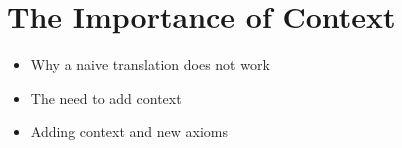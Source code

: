 \section{The Importance of Context}

\begin{itemize}
  \item Why a naive translation does not work
  \item The need to add context
  \item Adding context and new axioms
\end{itemize}

